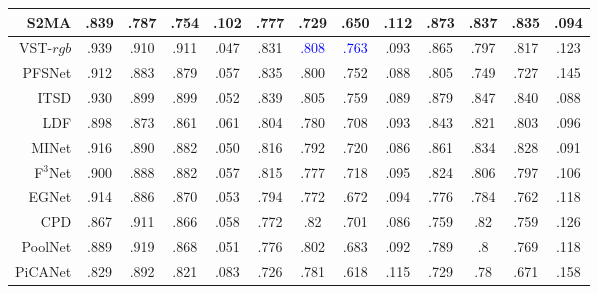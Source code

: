 \begin{table}[!ht]
{\begin{tabular}{rcccccccccccc}
			S2MA    \cite{liu2020learning} 
			& .839 & .787 & .754 & 	.102 
			& .777 & .729 & .650 & .112 
			& .873 & .837 &	.835 & .094 \\
			
			
			\midrule[1pt] 
			
			
			VST-$rgb$ \cite{liu2021visual} 
			& .939 & .910 & .911 & .047
			& .831 & \textcolor{blue}{.808} & \textcolor{blue}{.763} & .093 
			& .865 & .797 & .817 & .123 
			\\ 
			
			PFSNet \cite{ma2021pyramidal}
			& .912 & .883 & .879 & .057 
			& .835 & .800 & .752 & .088 
			& .805 & .749 & .727 & .145 
			\\ 
			
			
			ITSD \cite{zhou2020interactive} 
			& .930 & .899 & .899 & .052 
			& .839 & .805 & .759 & .089 
			& .879 & .847 & .840 & .088 
			\\ 
			
			
			
			LDF \cite{wei2020label} 
			& .898 & .873 & .861 & .061 
			& .804 & .780 & .708 & .093 
			& .843 & .821 & .803 & .096 
			\\ 
			
			
			MINet \cite{pang2020multi} 
			& .916 & .890 & .882 & .050 
			& .816 & .792 & .720 & .086 
			& .861 & .834 & .828 & .091 
			\\ 
			
			F$^{3}$Net  \cite{wei2020f3net}
			& .900 & .888 & .882 & .057 
			& .815 & .777 & .718 & .095 
			& .824 & .806 & .797 & .106 
			\\ 
			
			
			EGNet   \cite{zhao2019egnet}
			& .914 & .886 & .870 & .053 
			& .794 & .772 & .672 & .094 
			& .776 & .784 & .762 & .118 
			\\ 
			
			CPD  \cite{wu2019cascaded}
			& .867 & .911 & .866 & .058 
			& .772 & .82  & .701 & .086 
			& .759 & .82  & .759 & .126 \\
			
			PoolNet \cite{liu2019simple}
			& .889 & .919 & .868 & .051 
			& .776 & .802 & .683 & .092 
			& .789 & .8   & .769 & .118 \\
			
			PiCANet \cite{liu2018picanet}
			& .829 & .892 & .821 & .083 
			& .726 & .781 & .618 & .115 
			& .729 & .78  & .671 & .158 \\
			

\end{tabular}}
\end{table}
